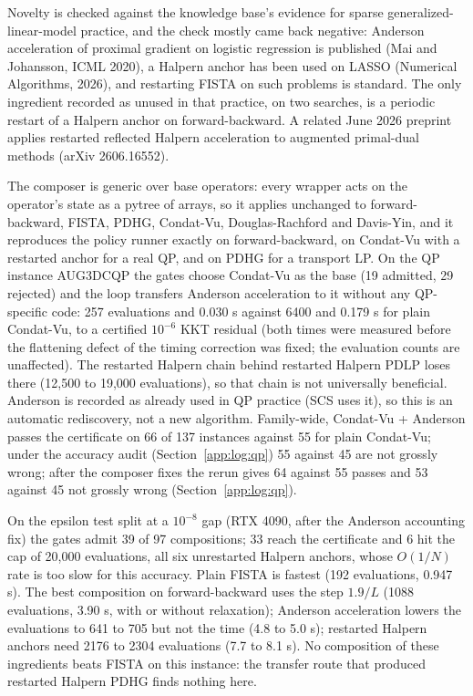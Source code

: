 Novelty is checked against the knowledge base's evidence for sparse
generalized-linear-model practice, and the check mostly came back negative:
Anderson acceleration of proximal gradient on logistic regression is
published (Mai and Johansson, ICML 2020), a Halpern anchor has been used on
LASSO (Numerical Algorithms, 2026), and restarting FISTA on such problems is
standard. The only ingredient recorded as unused in that practice, on two
searches, is a periodic restart of a Halpern anchor on forward-backward. A
related June 2026 preprint applies restarted reflected Halpern acceleration
to augmented primal-dual methods (arXiv 2606.16552).

The composer is generic over base operators: every wrapper acts on the
operator's state as a pytree of arrays, so it applies unchanged to forward-backward, FISTA,
PDHG, Condat-Vu, Douglas-Rachford and Davis-Yin, and it reproduces the policy
runner exactly on forward-backward, on Condat-Vu with a restarted anchor for a
real QP, and on PDHG for a transport LP. On the QP instance AUG3DCQP the gates
choose Condat-Vu as the base (19 admitted, 29 rejected) and the loop transfers
Anderson acceleration to it without any QP-specific code: 257 evaluations and
0.030 s against 6400 and 0.179 s for plain Condat-Vu, to a certified $10^{-6}$
KKT residual (both times were measured before the flattening defect of
the timing correction was fixed; the evaluation counts are unaffected). The restarted Halpern chain behind restarted Halpern PDLP loses
there (12,500 to 19,000 evaluations), so that chain is not universally
beneficial. Anderson is recorded as already used in QP practice (SCS uses it),
so this is an automatic rediscovery, not a new algorithm. Family-wide, Condat-Vu + Anderson passes the
certificate on 66 of 137 instances against 55 for plain Condat-Vu; under the
accuracy audit (Section~\ref{app:log:qp}) 55 against 45 are not grossly
wrong; after the composer fixes the rerun gives 64 against 55 passes and 53
against 45 not grossly wrong (Section~\ref{app:log:qp}).

On the epsilon test split at a $10^{-8}$ gap (RTX 4090, after the Anderson accounting fix)
the gates admit 39 of 97 compositions; 33 reach the certificate and 6 hit the cap of
20,000 evaluations, all six unrestarted Halpern anchors, whose $O(1/N)$ rate is too slow
for this accuracy. Plain FISTA is fastest (192 evaluations, 0.947 s). The best
composition on forward-backward uses the step $1.9/L$ (1088 evaluations, 3.90 s, with or
without relaxation); Anderson acceleration lowers the evaluations to 641 to 705 but not
the time (4.8 to 5.0 s); restarted Halpern anchors need 2176 to 2304 evaluations (7.7 to
8.1 s). No composition of these ingredients beats FISTA on this instance: the transfer
route that produced restarted Halpern PDHG finds nothing here.


